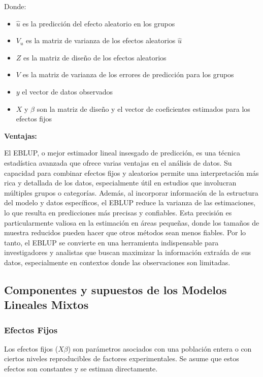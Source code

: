 \documentclass[12pt,spanish]{article}
\begin{document}
Donde:
\begin{itemize}
    \item $\hat{u}$ es la predicción del efecto aleatorio en los grupos
    \item $V_u$ es la matriz de varianza de los efectos aleatorios $\hat{u}$
    \item $Z$ es la matriz de diseño de los efectos aleatorios
    \item $V$ es la matriz de varianza de los errores de predicción para los grupos
    \item $y$ el vector de datos observados
    \item $X$ y $\beta$ son la matriz de diseño y el vector de coeficientes estimados para los efectos fijos
\end{itemize}

\textbf{Ventajas:}

El EBLUP, o mejor estimador lineal insesgado de predicción, es una técnica estadística avanzada que ofrece varias ventajas en el análisis de datos. Su capacidad para combinar efectos fijos y aleatorios permite una interpretación más rica y detallada de los datos, especialmente útil en estudios que involucran múltiples grupos o categorías. Además, al incorporar información de la estructura del modelo y datos específicos, el EBLUP reduce la varianza de las estimaciones, lo que resulta en predicciones más precisas y confiables. Esta precisión es particularmente valiosa en la estimación en áreas pequeñas, donde los tamaños de muestra reducidos pueden hacer que otros métodos sean menos fiables. Por lo tanto, el EBLUP se convierte en una herramienta indispensable para investigadores y analistas que buscan maximizar la información extraída de sus datos, especialmente en contextos donde las observaciones son limitadas.

\subsection*{Componentes y supuestos de los Modelos Lineales Mixtos}

\subsubsection*{ Efectos Fijos}

Los efectos fijos ($X\beta$) son parámetros asociados con una población entera o con ciertos niveles reproducibles de factores experimentales. Se asume que estos efectos son constantes y se estiman directamente.
\end{document}
